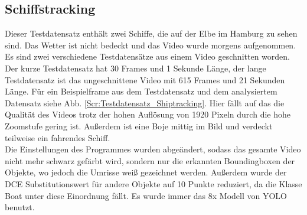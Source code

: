 \subsection{Schiffstracking \label{ev:shiptracking}}
{ 
	Dieser Testdatensatz enthält zwei Schiffe, die auf der Elbe im Hamburg zu sehen sind. Das Wetter ist nicht bedeckt und das Video wurde morgens aufgenommen. Es sind zwei verschiedene Testdatensätze aus einem Video geschnitten worden. Der kurze Testdatensatz hat 30 Frames und 1 Sekunde Länge, der lange Testdatensatz ist das ungeschnittene Video mit 615 Frames und 21 Sekunden Länge. Für ein Beispielframe aus dem Testdatensatz und dem analysiertem Datensatz siehe Abb. \ref{Scr:Testdatensatz_Shiptracking}. Hier fällt auf das die Qualität des Videos trotz der hohen Auflösung von 1920  Pixeln durch die hohe Zoomstufe gering ist. Außerdem ist eine Boje mittig im Bild und verdeckt teilweise ein fahrendes Schiff. \\
	Die Einstellungen des Programmes wurden abgeändert, sodass das gesamte Video nicht mehr schwarz gefärbt wird, sondern nur die erkannten Boundingboxen der Objekte, wo jedoch die Umrisse weiß gezeichnet werden. Außerdem wurde der DCE Substitutionswert für andere Objekte auf 10 Punkte reduziert, da die Klasse \glqq Boat\grqq{} unter diese Einordnung fällt. Es wurde immer das 8x Modell von YOLO benutzt. \\


}
